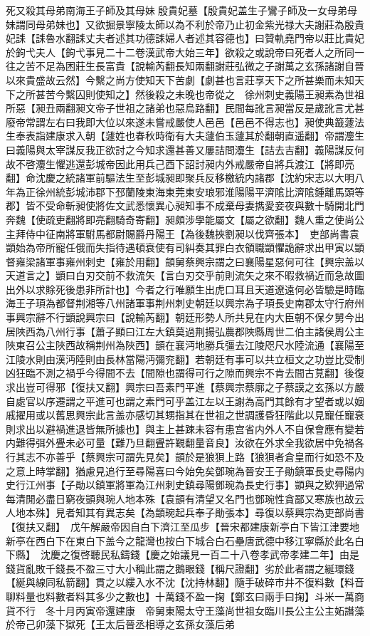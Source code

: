 死又殺其母弟南海王子師及其母妹殷貴妃墓【殷貴妃盖生子鸞子師及一女母弟母妹謂同母弟妹也】又欲掘景寧陵太師以為不利於帝乃止初金紫光禄大夫謝莊為殷貴妃誄【誄魯水翻誄丈夫者述其功德誄婦人者述其容德也】曰贊軌堯門帝以莊比貴妃於鉤弋夫人【鉤弋事見二十二卷漢武帝大始三年】欲殺之或說帝曰死者人之所同一往之苦不足為困莊生長富貴【說輸芮翻長知兩翻謝莊弘微之子謝萬之玄孫諸謝自晉以來貴盛故云然】今繫之尚方使知天下苦劇【劇甚也言莊享天下之所甚樂而未知天下之所甚苦今繫囚則使知之】然後殺之未晚也帝從之　徐州刺史義陽王昶素為世祖所惡【昶丑兩翻昶文帝子世祖之諸弟也惡烏路翻】民間每訛言昶當反是歲訛言尤甚廢帝常謂左右曰我即大位以來遂未嘗戒嚴使人邑邑【邑邑不得志也】昶使典籖蘧法生奉表詣建康求入朝【蘧姓也春秋時衛有大夫蘧伯玉蘧其於翻朝直遥翻】帝謂灋生曰義陽與太宰謀反我正欲討之今知求還甚善又屢詰問灋生【詰去吉翻】義陽謀反何故不啓灋生懼逃還彭城帝因此用兵己酉下詔討昶内外戒嚴帝自將兵渡江【將即亮翻】命沈慶之統諸軍前驅法生至彭城昶即聚兵反移檄統内諸郡【沈約宋志以大明八年為正徐州統彭城沛郡下邳蘭陵東海東莞東安琅邪淮陽陽平濟隂比濟隂鍾離馬頭等郡】皆不受命斬昶使將佐文武悉懷異心昶知事不成棄母妻擕愛妾夜與數十騎開北門奔魏【使疏吏翻將即亮翻騎奇寄翻】昶頗涉學能屬文【屬之欲翻】魏人重之使尚公主拜侍中征南將軍駙馬都尉賜爵丹陽王【為後魏挾劉昶以伐齊張本】　吏部尚書袁顗始為帝所寵任俄而失指待遇頓衰使有司糾奏其罪白衣領職顗懼詭辭求出甲寅以顗督雍梁諸軍事雍州刺史【雍於用翻】顗舅蔡興宗謂之曰襄陽星惡何可往【興宗盖以天道言之】顗曰白刃交前不救流矢【言白刃交乎前則流矢之來不暇救禍近而急故圖出外以求賖死後患非所計也】今者之行唯願生出虎口耳且天道遼遠何必皆驗是時臨海王子頊為都督荆湘等八州諸軍事荆州刺史朝廷以興宗為子頊長史南郡太守行府州事興宗辭不行顗說興宗曰【說輸芮翻】朝廷形勢人所共見在内大臣朝不保夕舅今出居陜西為八州行事【蕭子顯曰江左大鎮莫過荆揚弘農郡陜縣周世二伯主諸侯周公主陜東召公主陜西故稱荆州為陜西】顗在襄沔地勝兵彊去江陵咫尺水陸流通【襄陽至江陵水則由漢沔陸則由長林當陽沔彌兖翻】若朝廷有事可以共立桓文之功豈比受制凶狂臨不測之禍乎今得間不去【間隙也謂得可行之隙而興宗不肯去間古莧翻】後復求出豈可得邪【復扶又翻】興宗曰吾素門平進【蔡興宗蔡廓之子蔡謨之玄孫以方嚴自處官以序遷謂之平進可也謂之素門可乎盖江左以王謝為高門其餘有才望者或以姻戚擢用或以舊思興宗此言盖亦感切其甥指其在世祖之世調護昏狂階此以見寵任寵衰則求出以避禍進退皆無所據也】與主上甚踈未容有患宫省内外人不自保會應有變若内難得弭外舋未必可量【難乃旦翻舋許覲翻量音良】汝欲在外求全我欲居中免禍各行其志不亦善乎【蔡興宗可謂先見矣】顗於是狼狽上路【狼狽者倉皇而行如恐不及之意上時掌翻】猶慮見追行至尋陽喜曰今始免矣鄧琬為晉安王子勛鎮軍長史尋陽内史行江州事【子勛以鎮軍將軍為江州刺史鎮尋陽鄧琬為長史行事】顗與之欵狎過常每清閒必盡日窮夜顗與琬人地本殊【袁顗有清望又名門也鄧琬性貪鄙又寒族也故云人地本殊】見者知其有異志矣【為顗琬起兵奉子勛張本】尋復以蔡興宗為吏部尚書【復扶又翻】　戊午解嚴帝因自白下濟江至瓜步【晉宋都建康新亭白下皆江津要地新亭在西白下在東白下盖今之龍灣也按白下城合白石壘唐武德中移江寧縣於此名白下縣】　沈慶之復啓聽民私鑄錢【慶之始議見一百二十八卷孝武帝孝建二年】由是錢貨亂敗千錢長不盈三寸大小稱此謂之鵝眼錢【稱尺證翻】劣於此者謂之綖環錢【綖與線同私箭翻】貫之以縷入水不沈【沈持林翻】隨手破碎市井不復料數【料音聊料量也料數者料其多少之數也】十萬錢不盈一掬【鄭玄曰兩手曰掬】斗米一萬商貨不行　冬十月丙寅帝還建康　帝舅東陽太守王藻尚世祖女臨川長公主公主妬譖藻於帝己卯藻下獄死【王太后晉丞相導之玄孫女藻后弟